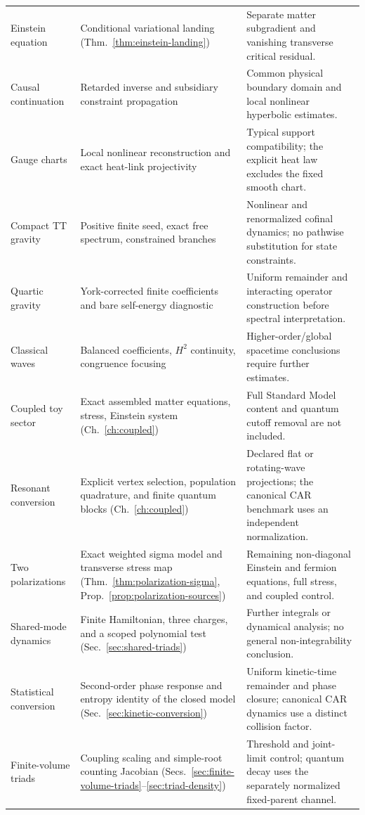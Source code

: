 \documentclass[11pt,a4paper,oneside]{book}
\theoremstyle{plain}
\theoremstyle{definition}
\theoremstyle{remark}
\begin{document}
\begin{longtable}{@{}>{\raggedright\arraybackslash}p{}>{\raggedright\arraybackslash}p{}>{\raggedright\arraybackslash}p{}@{}}
Einstein equation & Conditional variational landing (Thm.~\ref{thm:einstein-landing}) & Separate matter subgradient and vanishing transverse critical residual.\\[1pt]
Causal continuation & Retarded inverse and subsidiary constraint propagation & Common physical boundary domain and local nonlinear hyperbolic estimates.\\[1pt]
Gauge charts & Local nonlinear reconstruction and exact heat-link projectivity & Typical support compatibility; the explicit heat law excludes the fixed smooth chart.\\[1pt]
Compact TT gravity & Positive finite seed, exact free spectrum, constrained branches & Nonlinear and renormalized cofinal dynamics; no pathwise substitution for state constraints.\\[1pt]
Quartic gravity & York-corrected finite coefficients and bare self-energy diagnostic & Uniform remainder and interacting operator construction before spectral interpretation.\\[1pt]
Classical waves & Balanced coefficients, $H^2$ continuity, congruence focusing & Higher-order/global spacetime conclusions require further estimates.\\[1pt]
Coupled toy sector & Exact assembled matter equations, stress, Einstein system (Ch.~\ref{ch:coupled}) & Full Standard Model content and quantum cutoff removal are not included.\\[1pt]
Resonant conversion & Explicit vertex selection, population quadrature, and finite quantum blocks (Ch.~\ref{ch:coupled}) & Declared flat or rotating-wave projections; the canonical CAR benchmark uses an independent normalization.\\[1pt]
Two polarizations & Exact weighted sigma model and transverse stress map (Thm.~\ref{thm:polarization-sigma}, Prop.~\ref{prop:polarization-sources}) & Remaining non-diagonal Einstein and fermion equations, full stress, and coupled control.\\[1pt]
Shared-mode dynamics & Finite Hamiltonian, three charges, and a scoped polynomial test (Sec.~\ref{sec:shared-triads}) & Further integrals or dynamical analysis; no general non-integrability conclusion.\\[1pt]
Statistical conversion & Second-order phase response and entropy identity of the closed model (Sec.~\ref{sec:kinetic-conversion}) & Uniform kinetic-time remainder and phase closure; canonical CAR dynamics use a distinct collision factor.\\[1pt]
Finite-volume triads & Coupling scaling and simple-root counting Jacobian (Secs.~\ref{sec:finite-volume-triads}--\ref{sec:triad-density}) & Threshold and joint-limit control; quantum decay uses the separately normalized fixed-parent channel.\\[1pt]

\end{longtable}
\end{document}
